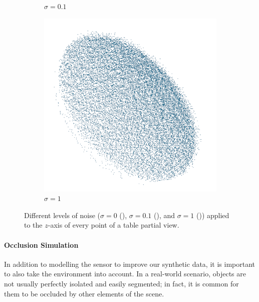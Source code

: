 \begin{figure}[!t]
\begin{subfigure}{0.32\textwidth}
		\caption{$\sigma=0.1$}
		\label{subfig:objrecog:noise:01}
	\end{subfigure}
	\hfill
	\begin{subfigure}{0.32\textwidth}
		\centering
		\includegraphics[width=\linewidth]{Figures/ObjRecog/stddev_1}
		\caption{$\sigma=1$}
		\label{subfig:objrecog:noise:1}
	\end{subfigure}
	\hfill
	\caption{Different levels of noise ($\sigma=0$ (), $\sigma=0.1$ (), and $\sigma=1$ ()) applied to the $z$-axis of every point of a table partial view.}
	\label{fig:objrecog:noise}
\end{figure}

\paragraph{Occlusion Simulation}

In addition to modelling the sensor to improve our synthetic data, it is important to also take the environment into account. In a real-world scenario, objects are not usually perfectly isolated and easily segmented; in fact, it is common for them to be occluded by other elements of the scene.

